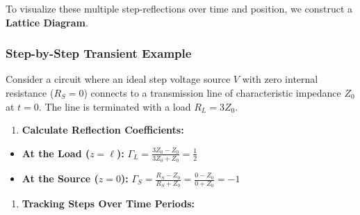 \documentclass[
]{article}
\providecommand{\tightlist}{%
  \setlength{\itemsep}{0pt}\setlength{\parskip}{0pt}}
\begin{document}
To visualize these multiple step-reflections over time and position, we
construct a \textbf{Lattice Diagram}.

\subsubsection{Step-by-Step Transient
Example}\label{step-by-step-transient-example}

Consider a circuit where an ideal step voltage source \(V\) with zero
internal resistance (\(R_S = 0\)) connects to a transmission line of
characteristic impedance \(Z_0\) at \(t=0\). The line is terminated with
a load \(R_L = 3Z_0\).

\begin{enumerate}
\def\labelenumi{\arabic{enumi}.}
\tightlist
\item
  \textbf{Calculate Reflection Coefficients:}
\end{enumerate}

\begin{itemize}
\tightlist
\item
  \textbf{At the Load (\(z = \ell\)):}
  \(\Gamma_L = \frac{3Z_0 - Z_0}{3Z_0 + Z_0} = \frac{1}{2}\)
\item
  \textbf{At the Source (\(z = 0\)):}
  \(\Gamma_S = \frac{R_S - Z_0}{R_S + Z_0} = \frac{0 - Z_0}{0 + Z_0} = -1\)
\end{itemize}

\begin{enumerate}
\def\labelenumi{\arabic{enumi}.}
\setcounter{enumi}{1}
\tightlist
\item
  \textbf{Tracking Steps Over Time Periods:}
\end{enumerate}
\end{document}
